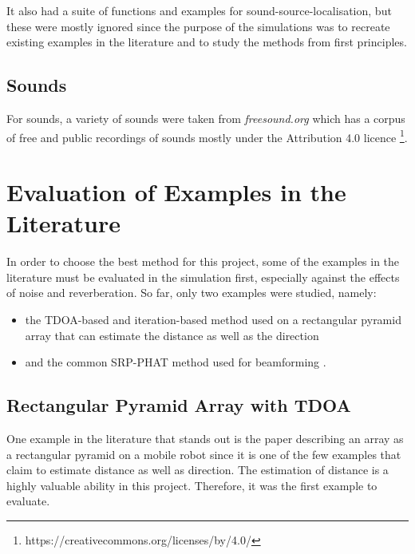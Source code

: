 \documentclass{report}
\begin{document}
It also had a suite of functions and examples for sound-source-localisation, but these were mostly ignored since the purpose of the simulations was to recreate existing examples in the literature and to study the methods from first principles.

\subsection{Sounds}

For sounds, a variety of sounds were taken from \textit{freesound.org} which has a corpus of free and public recordings of sounds mostly under the Attribution 4.0 licence \footnote{https://creativecommons.org/licenses/by/4.0/}.

\section{Evaluation of Examples in the Literature}

In order to choose the best method for this project, some of the examples in the literature must be evaluated in the simulation first, especially against the effects of noise and reverberation. So far, only two examples were studied, namely:
\begin{itemize}
	\item the TDOA-based and iteration-based method used on a rectangular pyramid array that can estimate the distance as well as the direction \cite{chen_sound_2019}
	\item and the common SRP-PHAT method used for beamforming \cite{valin_localization_2004} \cite{valin_robust_2007}.
\end{itemize}



\subsection{Rectangular Pyramid Array with TDOA}

One example in the literature that stands out is the paper describing an array as a rectangular pyramid on a mobile robot \cite{chen_sound_2019} since it is one of the few examples that claim to estimate distance as well as direction. The estimation of distance is a highly valuable ability in this project. Therefore, it was the first example to evaluate.
\end{document}
